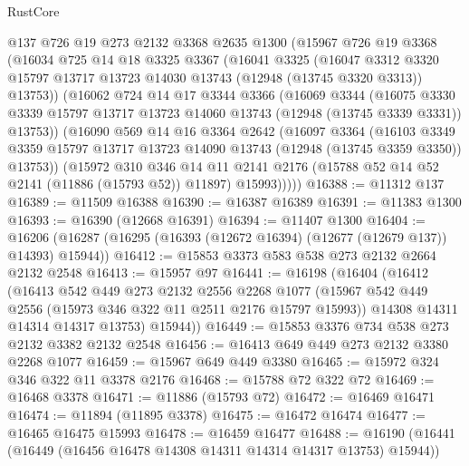 \begin{lexlean}{RustCore}
\begin{coremodule}
    @137
    @726
    @19
    @273
    @2132
    @3368
    @2635
    @1300
    (@15967
      @726
      @19
      @3368
      (@16034
        @725
        @14
        @18
        @3325
        @3367
        (@16041
          @3325
          (@16047
            @3312
            @3320
            @15797
            @13717
            @13723
            @14030
            @13743
            (@12948 (@13745 @3320 @3313))
            @13753))
        (@16062
          @724
          @14
          @17
          @3344
          @3366
          (@16069
            @3344
            (@16075
              @3330
              @3339
              @15797
              @13717
              @13723
              @14060
              @13743
              (@12948 (@13745 @3339 @3331))
              @13753))
          (@16090
            @569
            @14
            @16
            @3364
            @2642
            (@16097
              @3364
              (@16103
                @3349
                @3359
                @15797
                @13717
                @13723
                @14090
                @13743
                (@12948 (@13745 @3359 @3350))
                @13753))
            (@15972
              @310
              @346
              @14
              @11
              @2141
              @2176
              (@15788 @52 @14 @52 @2141 (@11886 (@15793 @52)) @11897)
              @15993)))))
@16388 := @11312 @137
@16389 := @11509 @16388
@16390 := @16387 @16389
@16391 := @11383 @1300
@16393 := @16390 (@12668 @16391)
@16394 := @11407 @1300
@16404 := @16206 (@16287 (@16295 (@16393 (@12672 @16394) (@12677 (@12679 @137)) @14393) @15944))
@16412 := @15853 @3373 @583 @538 @273 @2132 @2664 @2132 @2548
@16413 := @15957 @97
@16441 := @16198
    (@16404
      (@16412
        (@16413
          @542
          @449
          @273
          @2132
          @2556
          @2268
          @1077
          (@15967 @542 @449 @2556 (@15973 @346 @322 @11 @2511 @2176 @15797 @15993))
          @14308
          @14311
          @14314
          @14317
          @13753)
        @15944))
@16449 := @15853 @3376 @734 @538 @273 @2132 @3382 @2132 @2548
@16456 := @16413 @649 @449 @273 @2132 @3380 @2268 @1077
@16459 := @15967 @649 @449 @3380
@16465 := @15972 @324 @346 @322 @11 @3378 @2176
@16468 := @15788 @72 @322 @72
@16469 := @16468 @3378
@16471 := @11886 (@15793 @72)
@16472 := @16469 @16471
@16474 := @11894 (@11895 @3378)
@16475 := @16472 @16474
@16477 := @16465 @16475 @15993
@16478 := @16459 @16477
@16488 := @16190 (@16441 (@16449 (@16456 @16478 @14308 @14311 @14314 @14317 @13753) @15944))

\end{coremodule}
\end{lexlean}
